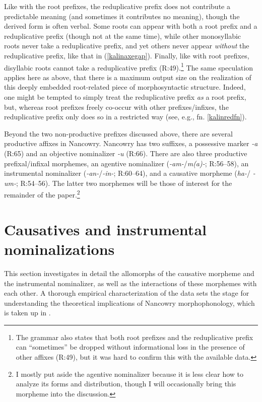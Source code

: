 \documentclass[output=paper]{langscibook}
\begin{document}
\noindent Like with the root prefixes, the reduplicative prefix does not contribute a predictable meaning (and sometimes it contributes no meaning), though the derived form is often verbal. Some roots can appear with both a root prefix and a reduplicative prefix (though not at the same time), while other monosyllabic roots never take a reduplicative prefix, and yet others never appear \textit{without} the reduplicative prefix, like that in (\ref{kalinaxegap}). Finally, like with root prefixes, disyllabic roots cannot take a reduplicative prefix (R:49).\footnote{The grammar also states that both root prefixes and the reduplicative prefix can ``sometimes'' be dropped without informational loss in the presence of other affixes (R:49), but it was hard to confirm this with the available data.} The same speculation applies here as above, that there is a maximum output size on the realization of this deeply embedded root-related piece of morphosyntactic structure. Indeed, one might be tempted to simply treat the reduplicative prefix \textit{as} a root prefix, but, whereas root prefixes freely co-occur with other  prefixes/infixes, the reduplicative prefix only does so in a restricted way (see, e.g., fn. \ref{kalinredfn}).

Beyond the two non-productive prefixes discussed above, there are several productive affixes in Nancowry. Nancowry has two suffixes, a possessive marker \textit{-a} (R:65) and an objective nominalizer \textit{-u} (R:66). There are also three productive prefixal/infixal morphemes, an agentive nominalizer (\textit{-am-}/\textit{m(a)-}; R:56--58), an instrumental nominalizer (\textit{-an-}/\textit{-in-}; R:60--64), and a causative morpheme (\textit{ha-}/ \textit{-um-}; R:54--56). The latter two morphemes will be those of interest for the remainder of the paper.\footnote{I mostly put aside the agentive nominalizer because it is less clear how to analyze its forms and distribution, though I will occasionally bring this morpheme into the discussion.}

\section{Causatives and instrumental nominalizations}\label{sec:kalin:3}

This section investigates in detail the allomorphs of the causative morpheme and the instrumental nominalizer, as well as the interactions of these morphemes with each other. A thorough empirical characterization of the data sets the stage for understanding the theoretical implications of Nancowry morphophonology, which is taken up in .
\end{document}
